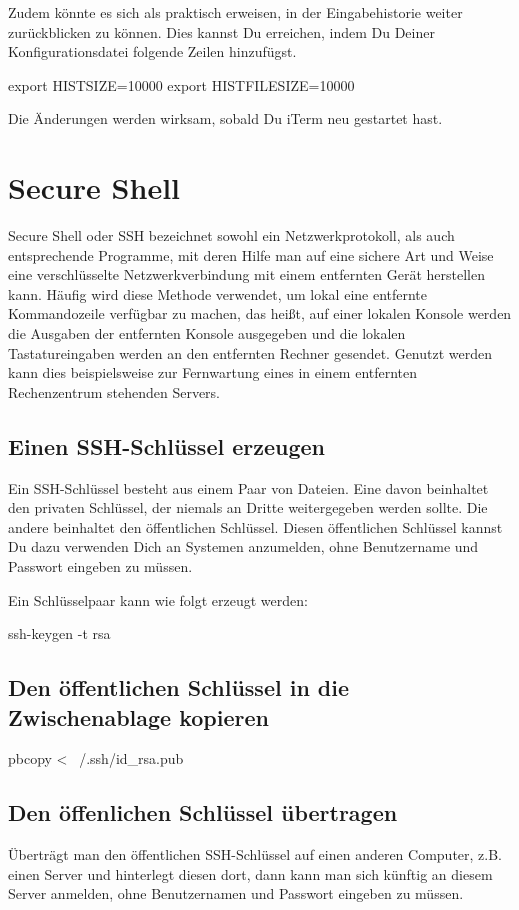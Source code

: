 \documentclass[]{article}
\begin{document}
Zudem könnte es sich als praktisch erweisen, in der Eingabehistorie weiter zurückblicken zu können. Dies kannst Du erreichen, indem Du Deiner Konfigurationsdatei folgende Zeilen hinzufügst.

\begin{bashcode}
export HISTSIZE=10000
export HISTFILESIZE=10000
\end{bashcode}

Die Änderungen werden wirksam, sobald Du iTerm neu gestartet hast.


\section{Secure Shell}
Secure Shell oder SSH bezeichnet sowohl ein Netzwerkprotokoll, als auch entsprechende Programme, mit deren Hilfe man auf eine sichere Art und Weise eine verschlüsselte Netzwerkverbindung mit einem entfernten Gerät herstellen kann. Häufig wird diese Methode verwendet, um lokal eine entfernte Kommandozeile verfügbar zu machen, das heißt, auf einer lokalen Konsole werden die Ausgaben der entfernten Konsole ausgegeben und die lokalen Tastatureingaben werden an den entfernten Rechner gesendet. Genutzt werden kann dies beispielsweise zur Fernwartung eines in einem entfernten Rechenzentrum stehenden Servers.\cite{wikipediaSecureShell}
\subsection{Einen SSH-Schlüssel erzeugen}
Ein SSH-Schlüssel besteht aus einem Paar von Dateien. Eine davon beinhaltet den privaten Schlüssel, der niemals an Dritte weitergegeben werden sollte. Die andere beinhaltet den öffentlichen Schlüssel. Diesen öffentlichen Schlüssel kannst Du dazu verwenden Dich an Systemen anzumelden, ohne Benutzername und Passwort eingeben zu müssen.

Ein Schlüsselpaar kann wie folgt erzeugt werden:
\begin{bashcode}
ssh-keygen -t rsa
\end{bashcode}

\subsection{Den öffentlichen Schlüssel in die Zwischenablage kopieren}
\begin{bashcode}
pbcopy < ~/.ssh/id_rsa.pub
\end{bashcode}

\subsection{Den öffenlichen Schlüssel übertragen}
Überträgt man den öffentlichen SSH-Schlüssel auf einen anderen Computer, z.B. einen Server und hinterlegt diesen dort, dann kann man sich künftig an diesem Server anmelden, ohne Benutzernamen und Passwort eingeben zu müssen.
\end{document}

